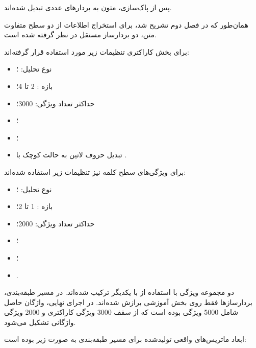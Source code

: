 \documentclass[12pt,a4paper,oneside]{report}
\begin{document}
پس از پاک‌سازی، متون به بردارهای عددی تبدیل شده‌اند.

همان‌طور که در فصل دوم تشریح شد، برای استخراج اطلاعات از دو سطح متفاوت متن، دو بردارساز مستقل در نظر گرفته شده است.

برای بخش کاراکتری تنظیمات زیر مورد استفاده قرار گرفته‌اند:

\begin{itemize}

	\item نوع تحلیل:
	؛

	\item بازه
	:
	2 تا 4؛

	\item حداکثر تعداد ویژگی:
	3000؛

	\item
	؛

	\item
	؛

	\item تبدیل حروف لاتین به حالت کوچک با
	.

\end{itemize}

برای ویژگی‌های سطح کلمه نیز تنظیمات زیر استفاده شده‌اند:

\begin{itemize}

	\item نوع تحلیل:
	؛

	\item بازه
	:
	1 تا 2؛

	\item حداکثر تعداد ویژگی:
	2000؛

	\item
	؛

	\item
	؛

	\item
	.

\end{itemize}

دو مجموعه ویژگی با استفاده از
با یکدیگر ترکیب شده‌اند. در مسیر طبقه‌بندی، بردارسازها فقط روی بخش آموزشی برازش شده‌اند. در اجرای نهایی، واژگان حاصل شامل 5000 ویژگی بوده است که از سقف 3000 ویژگی کاراکتری و 2000 ویژگی واژگانی تشکیل می‌شود.

ابعاد ماتریس‌های واقعی تولیدشده برای مسیر طبقه‌بندی به صورت زیر بوده است:
\end{document}
